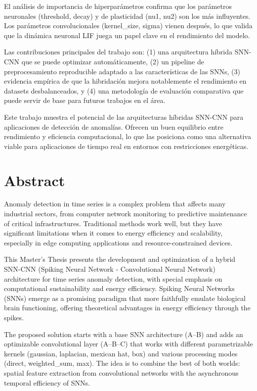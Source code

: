 El análisis de importancia de hiperparámetros confirma que los parámetros neuronales (threshold, decay) y de plasticidad (nu1, nu2) son los más influyentes. Los parámetros convolucionales (kernel\_size, sigma) vienen después, lo que valida que la dinámica neuronal LIF juega un papel clave en el rendimiento del modelo.

Las contribuciones principales del trabajo son: (1) una arquitectura híbrida SNN-CNN que se puede optimizar automáticamente, (2) un pipeline de preprocesamiento reproducible adaptado a las características de las SNNs, (3) evidencia empírica de que la hibridación mejora notablemente el rendimiento en datasets desbalanceados, y (4) una metodología de evaluación comparativa que puede servir de base para futuros trabajos en el área.

Este trabajo muestra el potencial de las arquitecturas híbridas SNN-CNN para aplicaciones de detección de anomalías. Ofrecen un buen equilibrio entre rendimiento y eficiencia computacional, lo que las posiciona como una alternativa viable para aplicaciones de tiempo real en entornos con restricciones energéticas.

\chapter*{Abstract}
\label{chap:resumen}

Anomaly detection in time series is a complex problem that affects many industrial sectors, from computer network monitoring to predictive maintenance of critical infrastructures. Traditional methods work well, but they have significant limitations when it comes to energy efficiency and scalability, especially in edge computing applications and resource-constrained devices.

This Master's Thesis presents the development and optimization of a hybrid SNN-CNN (Spiking Neural Network - Convolutional Neural Network) architecture for time series anomaly detection, with special emphasis on computational sustainability and energy efficiency. Spiking Neural Networks (SNNs) emerge as a promising paradigm that more faithfully emulate biological brain functioning, offering theoretical advantages in energy efficiency through the spikes.

The proposed solution starts with a base SNN architecture (A--B) and adds an optimizable convolutional layer (A--B--C) that works with different parametrizable kernels (gaussian, laplacian, mexican hat, box) and various processing modes (direct, weighted\_sum, max). The idea is to combine the best of both worlds: spatial feature extraction from convolutional networks with the asynchronous temporal efficiency of SNNs.

